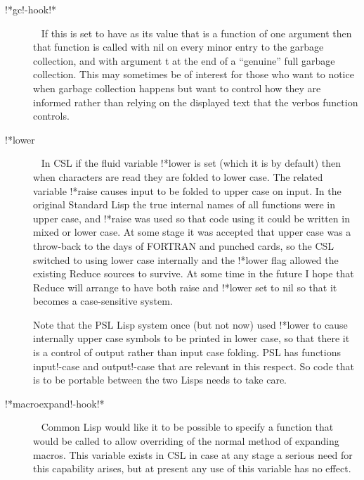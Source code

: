 \documentclass[a4paper,11pt]{article}
\begin{document}
\begin{description}
\item [{\ttfamily !*gc!-hook!*}]  ~\newline
If this is set to have as its value that is a function of one argument then
that function is called with {\ttfamily nil} on every minor entry to the
garbage collection, and with argument {\ttfamily t} at the end of a ``genuine''
full garbage collection. This may sometimes be of interest for those who
want to notice when garbage collection happens but want to control how
they are informed rather than relying on the displayed text that the
{\ttfamily verbos} function controls.

\item [{\ttfamily !*lower}]  ~\newline
In CSL if the fluid variable {\ttfamily !*lower} is set (which it is
by default) then when characters are read they are folded to lower case.
The related variable {\ttfamily !*raise} causes input to be folded to
upper case on input. In the original Standard Lisp the true internal names
of all functions were in upper case, and {\ttfamily !*raise} was used so
that code using it could be written in mixed or lower case. At some stage
it was accepted that upper case was a throw-back to the days of FORTRAN
and punched cards, so the CSL switched to using lower case
internally and the {\ttfamily !*lower} flag allowed the existing Reduce
sources to survive. At some time in the future I hope that Reduce will
arrange to have both {\ttfamily *raise} and {\ttfamily !*lower} set to
{\ttfamily nil} so that it becomes a case-sensitive system.
  
Note that the PSL Lisp system once (but not now) used {\ttfamily !*lower}
to cause internally upper case symbols to be printed in lower case,
so that there it is a control of output rather than input case folding.
PSL has functions {\ttfamily input!-case} and {\ttfamily output!-case}
that are relevant in this respect.
So code that is to be portable between the two Lisps needs to take care.

\item [{\ttfamily !*macroexpand!-hook!*}]  ~\newline
Common Lisp would like it to be possible to specify a function that would
be called to allow overriding of the normal method of expanding macros. This
variable exists in CSL in case at any stage a serious need for this
capability arises, but at present any use of this variable has no effect.


\end{description}
\end{document}

